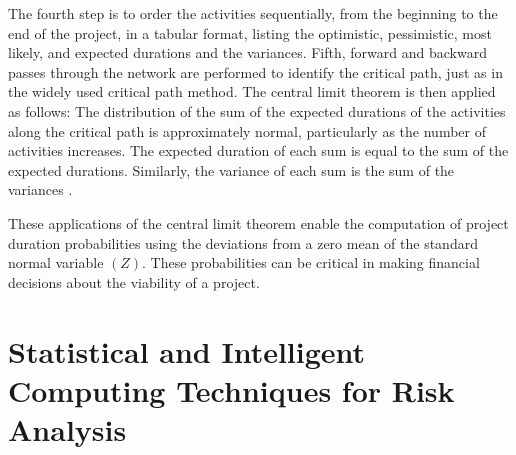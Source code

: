 The fourth step is to order the activities sequentially, from the beginning to the end of the project, in a tabular format, listing the optimistic, pessimistic, most likely, and expected durations and the variances. Fifth, forward and backward passes through the network are performed to identify the critical path, just as in the widely used critical path method. The central limit theorem is then applied as follows: The distribution of the sum of the expected durations of the activities along the critical path is approximately normal, particularly as the number of activities increases. The expected duration of each sum is equal to the sum of the expected durations. Similarly, the variance of each sum is the sum of the variances \cite{cottrell1999simplified}.

These applications of the central limit theorem enable the computation of project duration probabilities using the deviations from a zero mean of the standard normal variable $(Z)$. These probabilities can be critical in making financial decisions about the viability of a project. 

\section{Statistical and Intelligent Computing Techniques for Risk Analysis}

